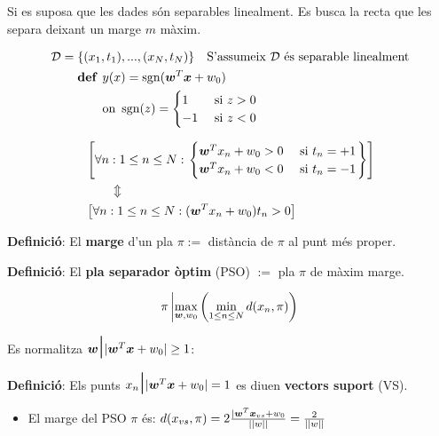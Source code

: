 Si es suposa que les dades són separables linealment. Es busca la recta que les separa deixant un marge $m$ màxim.

\begin{align*}
	\mathcal{D} &= \{ (x_1, t_1), ..., (x_N, t_N) \} \quad \text{S'assumeix $\mathcal{D}$ és separable linealment} \\
	& \phantom{{}={}}  
	\begin{aligned}
		\text{\textbf{def }} & y(x) = \op{sgn}(\boldsymbol{w}^T \boldsymbol{x} + w_0) \\
		& \text{on } \op{sgn}(z) = 
		\begin{cases}
			1 & \text{ si } z > 0 \\
			-1 & \text{ si } z < 0
		\end{cases}
	\end{aligned}
\end{align*}

\begin{align*}
	& \left[ \forall n : 1 \le n \le N : 
	\begin{rcases}
	\begin{cases}
		\boldsymbol{w}^T x_n + w_0 > 0 & \text{ si } t_n = +1 \\
		\boldsymbol{w}^T x_n + w_0 < 0 & \text{ si } t_n = -1
	\end{cases}
	\end{rcases} 
	\right] \\
	& \hspace{2em} \Updownarrow \\
	& \left[ \forall n : 1 \le n \le N : (\boldsymbol{w}^T x_n + w_0) t_n > 0 \right]
\end{align*}

\textbf{Definició}: El \textbf{marge} d'un pla $\pi := $ distància de $\pi$ al punt més proper.

\textbf{Definició}: El \textbf{pla separador òptim} (PSO) $:=$ pla $\pi$ de màxim marge.

$$
\pi \left| \max_{\boldsymbol{w}, w_0} \left( \min_{1 \le n \le N} d(x_n, \pi) \right)\right.
$$

Es normalitza $\bmath{w} \scalebox{1.8}{|} |\bmath{w}^T \bmath{x} + w_0| \ge 1$:

\textbf{Definició}: Els punts $x_n \scalebox{1.8}{|} |\bmath{w}^T \bmath{x} + w_0| = 1$ es diuen \textbf{vectors suport} (VS). 

\begin{itemize}
	\item El marge del PSO $\pi$ és: $d(x_{vs}, \pi) = 2 \frac{|\boldsymbol{w}^T \boldsymbol{x}_{vs} + w_0}{||w||} = \frac{2}{||w||}$
\end{itemize}


